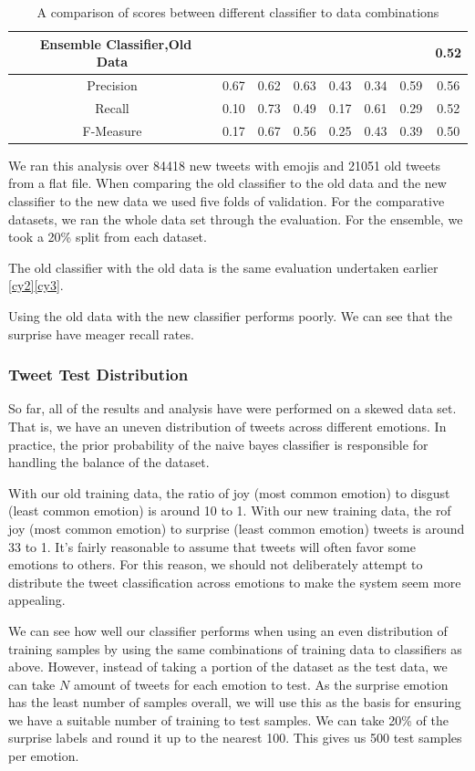 {\begin{table}[H]
{\begin{tabular}{|c|c|c|c|c|c|c|c|}
\ \textbf{Ensemble Classifier,Old Data} & & & & & & & 0.52 \\ 
 \hline
  Precision & 0.67 & 0.62  & 0.63  & 0.43 & 0.34  & 0.59 & 0.56 \\ 
 \hline
 Recall & 0.10  &0.73 & 0.49   & 0.17 &0.61 &0.29 & 0.52 \\
 \hline
 F-Measure & 0.17 & 0.67 &0.56  & 0.25 &0.43 & 0.39 & 0.50 \\
\hline
 
\end{tabular}}
\caption{A comparison of scores between different classifier to data combinations}
\end{table}


We ran this analysis over 84418 new tweets with emojis and 21051 old tweets from a flat file. When comparing the old classifier to the old data and the new classifier to the new data we used five folds of validation. For the comparative datasets, we ran the whole data set through the evaluation. For the ensemble, we took a 20\% split from each dataset.

The old classifier with the old data is the same evaluation undertaken earlier \ref{cy2}\ref{cy3}. 

Using the old data with the new classifier performs poorly. We can see that the surprise have meager recall rates.

\subsubsection{Tweet Test Distribution} \label{fTesting}

So far, all of the results and analysis have were performed on a skewed data set. That is, we have an uneven distribution of tweets across different emotions. In practice, the prior probability of the naive bayes classifier is responsible for handling the balance of the dataset.

With our old training data, the ratio of joy (most common emotion) to disgust (least common emotion) is around 10 to 1. With our new training data, the rof joy (most common emotion) to surprise (least common emotion) tweets is around 33 to 1. It's fairly reasonable to assume that tweets will often favor some emotions to others. For this reason, we should not deliberately attempt to distribute the tweet classification across emotions to make the system seem more appealing. 

We can see how well our classifier performs when using an even distribution of training samples by using the same combinations of training data to classifiers as above. However, instead of taking a portion of the dataset as the test data, we can take $N$ amount of tweets for each emotion to test. As the surprise emotion has the least number of samples overall, we will use this as the basis for ensuring we have a suitable number of training to test samples. We can take 20\% of the surprise labels and round it up to the nearest 100. This gives us 500 test samples per emotion.

}
